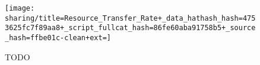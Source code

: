 \begin{figure*}[!htbp]
\begin{center}

\texttt{[image: sharing/title=Resource\_Transfer\_Rate+\_data\_hathash\_hash=4753625fc7f89aa8+\_script\_fullcat\_hash=86fe60aba91758b5+\_source\_hash=ffbe01c-clean+ext=]}

\caption{
TODO
}
\label{fig:sharing_channelmate}
\end{center}
\end{figure*}

